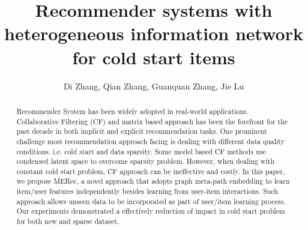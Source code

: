 \documentclass{ws-procs9x6}            %
\begin{document}
\title{Recommender systems with heterogeneous information network for cold start items}

\author{Di Zhang, Qian Zhang, Guanquan Zhang, Jie Lu}

\address{\textit{Decision Systems and e-Service Intelligence Laboratory,} \\
\textit{Centre for Artificial Intelligence}\\
University of Technology Sydney, Australia \\
Di.Zhang-7@student.uts.edu.au, Qian.Zhang-1@uts.edu.au \\
Guangquan.Zhang@uts.edu.au, Jie.Lu@uts.edu.au}

\begin{abstract}
Recommender System has been widely adopted in real-world applications. Collaborative Filtering (CF) and matrix based approach has been the forefront for the past decade in both implicit and explicit recommendation tasks. One prominent challenge most recommendation approach facing is dealing with different data quality conditions. i.e. cold start and data sparsity. Some model based CF methods use condensed latent space to overcome sparsity problem. However, when dealing with constant cold start problem, CF approach can be ineffective and costly. In this paper, we propose MERec, a novel approach that adopts graph meta-path embedding to learn item/user features independently besides learning from user-item interactions. Such approach allows unseen data to be incorporated as part of user/item learning process. Our experiments demonstrated a effectively reduction of impact in cold start problem for both new and sparse dataset.
\end{abstract}


\bodymatter
















\end{document}
